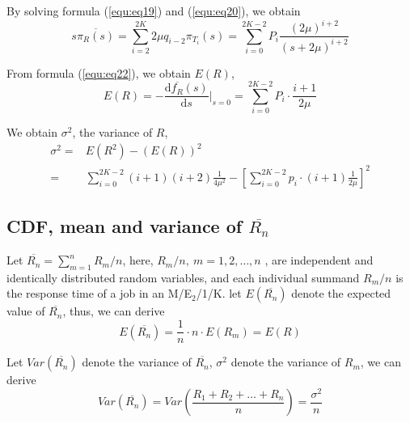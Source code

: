\documentclass[10pt,journal,letterpaper,compsoc]{IEEEtran}
\newcommand\du{\mathrm{d}}
\begin{document}
By solving formula (\ref{equ:eq19}) and (\ref{equ:eq20}), we obtain
\begin{equation}
\label{equ:eq21}
s\overline{\pi_R(s)}=\sum_{i=2}^{2K}2\mu q_{i-2}\pi_{T_i}(s)=\sum_{i=0}^{2K-2}P_i\frac{(2\mu)^{i+2}}{(s+2\mu)^{i+2}}
\end{equation}

From formula (\ref{equ:eq22}), we obtain $E(R)$,
\begin{equation}
\label{equ:eq22}
E(R)=-\frac{\du\overline{f_R}(s)}{\du s}|_{s=0}=\sum_{i=0}^{2K-2}P_i\cdot\frac{i+1}{2\mu}
\end{equation}

We obtain $\sigma^2$, the variance of $R$,
\begin{equation}
\label{equ:eq23}
  \begin{split}
    \sigma^2=&E(R^2)-(E(R))^2 \\
            =&\sum_{i=0}^{2K-2}(i+1)(i+2)\frac{1}{4\mu^2}-\left[ \sum_{i=0}^{2K-2}p_i\cdot(i+1)\frac{1}{2\mu} \right]^2
  \end{split}
\end{equation}

\subsection{CDF, mean and variance of $\overline{R_n}$} %
\label{subsec:CDFofRn}
Let $\overline{R_n}=\sum_{m=1}^nR_m/n$,  
here, $R_m/n,~m=1, 2, \dots,n$ , are independent and identically distributed
random variables, and
each individual summand $R_m/n$ is the response time of a job in an
M/E$_2$/1/K. 
let $E(\overline{R_n})$ denote the expected value of $\overline{R_n}$,
thus, we can derive
\begin{equation}
\label{equ:eq25}
E(\overline{R_n})=\frac{1}{n}\cdot n\cdot E(R_m)=E(R)
\end{equation}

Let $Var(\overline{R_n})$ denote the variance of $\overline{R_n}$,
$\sigma^2$ denote the variance of $R_m$, we can derive
\begin{equation}
\label{equ:eq26}
Var(\overline{R_n})=Var\left( \frac{R_1+R_2+\ldots+R_n}{n} \right)=\frac{\sigma^2}{n}
\end{equation}
\end{document}
